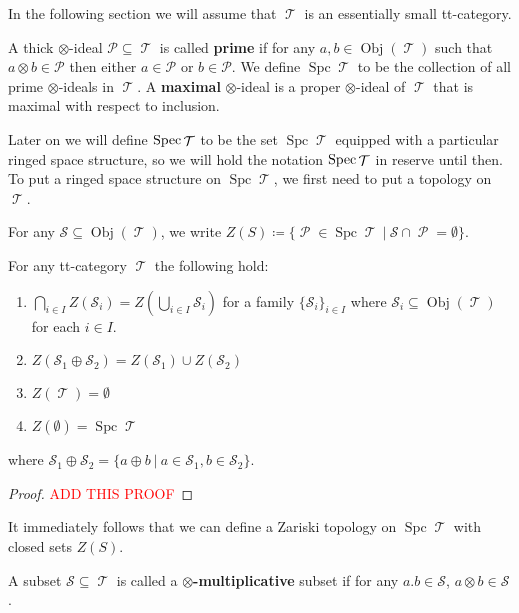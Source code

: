 \documentclass[11pt]{article}
\DeclareMathOperator{\ob}{Obj}
\DeclareMathOperator{\TT}{\mathcal{T}}
\DeclareMathOperator{\cP}{\mathcal{P}}
\DeclareMathOperator{\spc}{Spc}
\begin{document}
In the following section we will assume that $\TT$ is an essentially small tt-category.

\begin{defn}
A thick $\otimes$-ideal $\mathcal{P} \subseteq \TT$ is called \textbf{prime} if for any $a,b \in \ob(\TT)$ such that $a \otimes b \in \mathcal{P}$ then either $a \in \mathcal{P}$ or $b \in \mathcal{P}$. We define $\spc \TT$ to be the collection of all prime $\otimes$-ideals in $\TT$. A \textbf{maximal} $\otimes$-ideal is a proper $\otimes$-ideal of $\TT$ that is maximal with respect to inclusion.
\end{defn}

Later on we will define $\Spec \TT $ to be the set $\spc \TT$ equipped with a particular ringed space structure, so we will hold the notation $\Spec \TT$ in reserve until then. To put a ringed space structure on $\spc \TT$, we first need to put a topology on $\TT$.

\begin{defn}
For any $\mathcal{S} \subseteq \ob(\TT)$, we write $Z(S) \coloneqq \{\cP \in \spc \TT\:|\:\mathcal{S}\cap \cP = \emptyset\}$.
\end{defn}


\begin{prop}
For any tt-category $\TT$ the following hold:
\begin{enumerate}[1.]
	\item $\bigcap_{i \in I}Z(\mathcal{S}_i) = Z(\bigcup_{i \in I}\mathcal{S}_i)$ for a family $\{\mathcal{S}_i\}_{i \in I}$ where $\mathcal{S}_i \subseteq \ob(\TT)$ for each $i \in I$.
	\item $Z(\mathcal{S}_1 \oplus \mathcal{S}_2) = Z(\mathcal{S}_1) \cup Z(\mathcal{S}_2)$ 
	\item $Z(\TT) = \emptyset$
	\item $Z(\emptyset) = \spc \TT$
\end{enumerate}
where $\mathcal{S}_1 \oplus \mathcal{S}_2 = \{a \oplus b\:|\: a \in \mathcal{S}_1, b \in \mathcal{S}_2\}$.
\end{prop}
\begin{proof}
\large{\textcolor{red}{ADD THIS PROOF}}
\end{proof}

It immediately follows that we can define a Zariski topology on $\spc \TT$ with closed sets $Z(S)$.

\begin{defn}
A subset $\mathcal{S} \subseteq \TT$ is called a \textbf{$\otimes$-multiplicative} subset if for any $a.b \in \mathcal{S}$, $a \otimes b \in \mathcal{S}$.
\end{defn}
\end{document}
